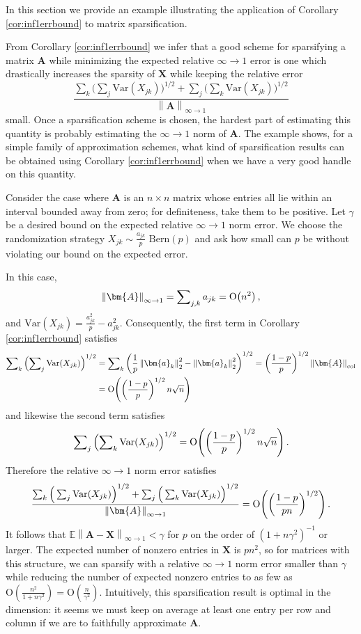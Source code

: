 \documentclass[11pt,letterpaper,twoside,reqno]{amsart}
\newcommand{\mat}[1]{\ensuremath{\bm{#1}}}
\newcommand{\E}{\ensuremath{\mathbb{E}}}
\newcommand{\norm}[1]{\ensuremath{\left\|#1\right\|}}
\newcommand{\infonorm}[1]{\ensuremath{\left\|#1\right\|_{\infty\rightarrow 1}}}
\newcommand{\infone}{\ensuremath{\infty\!\rightarrow\!\!1}}
\newcommand{\colnorm}[1]{\ensuremath{\left\|#1\right\|_{\text{\rm col}}}}
\newcommand{\asymO}[1]{\ensuremath{\mathop{\text{\rm O}}\!\left(#1\right)}}
\newcommand{\var}[1]{\ensuremath{\mathrm{Var}(#1)}}
\begin{document}
In this section we provide an example illustrating the application of Corollary \ref{cor:inf1errbound} to matrix sparsification.

From Corollary \ref{cor:inf1errbound} we infer that a good scheme for sparsifying a matrix $\mat{A}$ while minimizing the expected relative $\infone$ error is one which drastically increases the sparsity of $\mat{X}$ while keeping the relative error 
\[
\frac{\sum\nolimits_{k}\Big(\sum\nolimits_{j}\var{X_{jk}}\Big)^{1/2}+\sum\nolimits_{j}\Big(\sum\nolimits_{k}\var{X_{jk}}\Big)^{1/2}}{\infonorm{\mat{A}}}
\]
small. Once a sparsification scheme is chosen, the hardest part of estimating this quantity is probably estimating the $\infone$ norm of $\mat{A}$. The example shows, for a simple family of approximation schemes, what kind of sparsification results can be obtained using Corollary \ref{cor:inf1errbound} when we have a very good handle on this quantity. 

Consider the case where $\mat{A}$ is an $n\times n$ matrix whose entries all lie within an interval bounded away from zero; for definiteness, take them to be positive. Let $\gamma$ be a desired bound on the expected relative $\infone$ norm error. We choose the randomization strategy $X_{jk}\sim \frac{a_{jk}}{p}\text{ Bern}(p)$ and ask how small can $p$ be without violating our bound on the expected error.

In this case,
\[
\infonorm{\mat{A}}=\sum\nolimits_{j,k}a_{jk} = \asymO{n^{2}},
\]
and $\var{X_{jk}}=\frac{a_{jk}^{2}}{p}-a_{jk}^{2}.$ Consequently, the first term in Corollary \ref{cor:inf1errbound} satisfies
\[
\begin{aligned}
\sum\nolimits_{k}\left(\sum\nolimits_{j}\var{X_{jk}}\right)^{1/2} & =\sum\nolimits_{k}\left(\frac{1}{p}\norm{\mat{a}_{k}}_{2}^{2}-\norm{\mat{a}_{k}}_{2}^{2}\right)^{1/2}=\left(\frac{1-p}{p}\right)^{1/2}\colnorm{\mat{A}} \\
 & = \asymO{\left(\frac{1-p}{p}\right)^{1/2}n\sqrt{n}}
\end{aligned}
\]
and likewise the second term satisfies
\[
\sum\nolimits_{j}\left(\sum\nolimits_{k}\var{X_{jk}}\right)^{1/2} = \asymO{\left(\frac{1-p}{p}\right)^{1/2}n\sqrt{n}}.
\]
Therefore the relative $\infone$ norm error satisfies
\[
\frac{\sum\nolimits_{k}\Big(\sum\nolimits_{j}\var{X_{jk}}\Big)^{1/2}+\sum\nolimits_{j}\Big(\sum\nolimits_{k}\var{X_{jk}}\Big)^{1/2} }{\infonorm{\mat{A}}}= \asymO{\left(\frac{1-p}{pn}\right)^{1/2}}.
\]
It follows that $\E\infonorm{\mat{A}-\mat{X}}<\gamma$ for $p$ on the order of $(1+n\gamma^{2})^{-1}$ or larger. The expected number of nonzero entries in $\mat{X}$ is $pn^{2}$, so for matrices with this structure, we can sparsify with a relative $\infone$ norm error smaller than $\gamma$ while reducing the number of expected nonzero entries to as few as $\mathrm{O}(\frac{n^{2}}{1+n\gamma^{2}})=\mathrm{O}(\frac{n}{\gamma^{2}}).$ Intuitively, this sparsification result is optimal in the dimension: it seems we must keep on average at least one entry per row and column if we
are to faithfully approximate $\mat{A}$.
\end{document}

